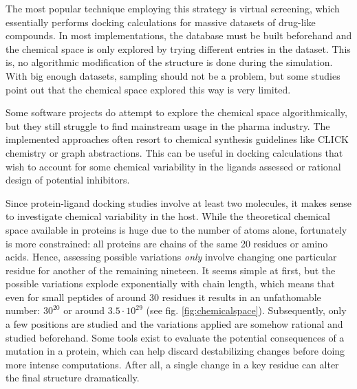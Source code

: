 The most popular technique employing this strategy is virtual screening, which essentially performs docking calculations for massive datasets of drug-like compounds. In most implementations, the database must be built beforehand and the chemical space is only explored by trying different entries in the dataset. This is, no algorithmic modification of the structure is done during the simulation. With big enough datasets, sampling should not be a problem, but some studies point out that the chemical space explored this way is very limited.\cite{virshup2013stochastic}

Some software projects do attempt to explore the chemical space algorithmically,\cite{oprea2001chemography,bon2010bioactivity,larsson2007chemgps,Goodnow_2016,Reymond_2015,Chari_2015,Maggiora_2014,Naveja_2017} but they still struggle to find mainstream usage in the pharma industry. The implemented approaches often resort to chemical synthesis guidelines like CLICK chemistry\cite{durrant2009} or graph abstractions.\cite{andersen2014} This can be useful in docking calculations that wish to account for some chemical variability in the ligands assessed or rational design of potential inhibitors.

Since protein-ligand docking studies involve at least two molecules, it makes sense to investigate chemical variability in the host. While the theoretical chemical space available in proteins is huge due to the number of atoms alone, fortunately is more constrained: all proteins are chains of the same 20 residues or amino acids. Hence, assessing possible variations \textit{only} involve changing one particular residue for another of the remaining nineteen. It seems simple at first, but the possible variations explode exponentially with chain length, which means that even for small peptides of around 30 residues it results in an unfathomable number: $ 30^{20} $ or around $ 3.5·10^{29} $ (see fig. \ref{fig:chemicalspace}). Subsequently, only a few positions are studied and the variations applied are somehow rational and studied beforehand. Some tools exist to evaluate the potential consequences of a mutation in a protein,\cite{kumar2009predicting,quan2016strum,fariselli2015inps,dehouck2011popmusic} which can help discard destabilizing changes before doing more intense computations. After all, a single change in a key residue can alter the final structure dramatically.\cite{kumar2006protherm}


